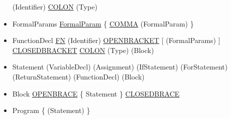 \begin{itemize}
		\subitem (Identifier) \ul{COLON} (Type)
	\item FormalParams
		\subitem \ul{FormalParam} \{ \ul{COMMA} (FormalParam) \}
	\item FunctionDecl
		\subitem \ul{FN} (Identifier) \ul{OPEN\un BRACKET} [ (FormalParams) ] \ul{CLOSED\un BRACKET} \ul{COLON} (Type) (Block)
	\item Statement
		\subitem (VariableDecl)
		\subitem (Assignment)
		\subitem (IfStatement)
		\subitem (ForStatement)
		\subitem (ReturnStatement)
		\subitem (FunctionDecl)
		\subitem (Block)
	\item Block
		\subitem \ul{OPEN\un BRACE} \{ Statement \} \ul{CLOSED\un BRACE}
	\item Program
		\subitem \{ (Statement) \}
\end{itemize}